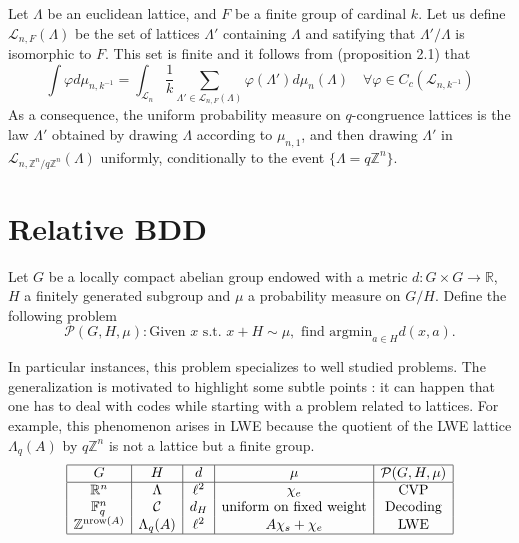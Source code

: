 \documentclass{article}
\begin{document}
Let $\Lambda$ be an euclidean lattice, and $F$ be a finite group of cardinal $k$. Let us define $\mathcal L_{n , F}(\Lambda ) $ be the set of lattices $\Lambda'$ containing $\Lambda$ and satifying that $\Lambda' / \Lambda $ is isomorphic to $F$. This set is finite and it follows from \cite{ordentlich2022new} (proposition 2.1) that
\[\int \varphi d\mu_{n,k^{-1}} = \int_{\mathcal L_n} \frac{1}{k}\sum_{\Lambda'\in \mathcal L_{n , F}(\Lambda )} \varphi(\Lambda') d\mu_{n}(\Lambda)  \quad \forall \varphi \in C_c(\mathcal L_{n,k^{-1}} ) \]
As a consequence, the uniform probability measure on $q$-congruence lattices is the law $\Lambda'$ obtained by drawing $\Lambda$ according to $\mu_{n,1}$, and then drawing $\Lambda'$ in $\mathcal L_{n,\mathbb Z^n /q\mathbb Z^n}(\Lambda)$ uniformly, conditionally to the event $\{\Lambda = q\mathbb Z^n\}$.   
\section{Relative BDD}%

Let $G$ be a locally compact abelian group endowed with a metric $d : G\times G \rightarrow \mathbb R$, $H$ a finitely generated subgroup and $\mu$ a probability measure on $G/H$. Define the following problem
$$\mathcal P (G,H,\mu) : \text{Given } x \text{ s.t. }x+H \sim \mu , \text{ find argmin}_{a\in H} d(x,a).$$

In particular instances, this problem specializes to well studied problems. The generalization is motivated to highlight some subtle points : it can happen that one has to deal with codes while starting with a problem related to lattices. For example, this phenomenon arises in LWE because the quotient of the LWE lattice $\Lambda_q(A)$ by $q\mathbb Z^n$ is not a lattice but a finite group. 
\[\begin{array}{|c|c|c| c | c|} 
\hline
G             & H                          & d     &  \mu              & \mathcal P (G,H,\mu)\\
\hline
\mathbb R^n   & \Lambda                    & \ell^2 & \chi_e            & \text{CVP}     \\
\mathbb F_q^n & \mathcal C                 & d_H    & \text{uniform on fixed weight}    & \text{Decoding}\\
\mathbb Z^{\text{nrow}(A)}  & \Lambda_q(A) & \ell^2 &  A \chi_s +\chi_e & \text{LWE}     \\
\hline
\end{array}\]
\end{document}
